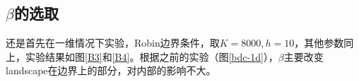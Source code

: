 \documentclass[12pt,a4paper]{article}
\begin{document}
%
%
%
%

\subsection{$\beta$的选取}

还是首先在一维情况下实验，Robin边界条件，取$K = 8000, h=10$，其他参数同上，实验结果如图\ref{B3}和\ref{B4}。根据之前的实验（图\ref{bdc-1d}），$\beta$主要改变landscape在边界上的部分，对内部的影响不大。
\end{document}

